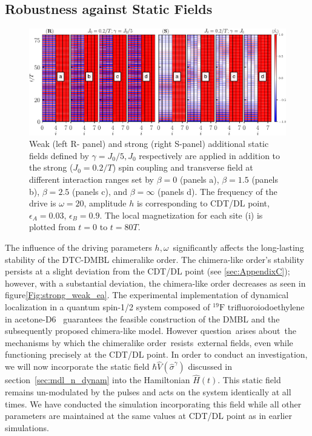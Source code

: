 \documentclass[12pt]{iopart}
\begin{document}
\subsection{\label{sec:level44} Robustness against Static Fields}
\begin{figure}[h!]
	\begin{center}
		\includegraphics[width=13cm]{figure13.pdf}
	\end{center}
	\caption{Weak (left R- panel) and strong (right S-panel) additional static fields defined by $\gamma = J_0/5, J_0$ respectively are applied in addition to the strong ($J_0=0.2/T$) spin coupling and transverse field at different interaction ranges set by $\beta = 0$ (panels a), $\beta= 1.5$ (panels b), $\beta=2.5$ (panels c), and $\beta= \infty$ (panels d). The frequency of the drive is $\omega = 20$, amplitude $h$ is corresponding to CDT/DL point, $\epsilon_A=0.03$, $\epsilon_B=0.9$.  The local magnetization for each site (i) is plotted from $t=0$ to $t=80 T$.}
	\label{Fig:robustness}
\end{figure}
The influence of the driving parameters $h, \omega$ significantly affects the long-lasting stability of the DTC-DMBL chimeralike order. The chimera-like order's stability persists at a slight deviation from the CDT/DL point (see \ref{sec:AppendixC}); however, with a substantial deviation, the chimera-like order decreases as seen in figure\ref{Fig:strong_weak_ea}. The experimental implementation of dynamical localization in a quantum spin-1/2 system composed of $^{19}\mathrm{F}$ trifluoroiodoethylene in acetone-D6~\cite{Hegde2014} guarantees the feasible construction of the DMBL and the subsequently proposed chimera-like model. However question arises about the mechanisms by which the chimeralike order resists external fields, even while functioning precisely at the CDT/DL point.
In order to conduct an investigation, we will now incorporate the static field $\hbar\hat{V}(\hat{\sigma}^{\gamma})$ discussed in section~\ref{sec:mdl_n_dynam} into the Hamiltonian $\hat{H}(t)$. This static field remains un-modulated by the pulses and acts on the system identically at all times. We have conducted the simulation incorporating this field while all other parameters are maintained at the same values at CDT/DL point as in earlier simulations. 
\end{document}
